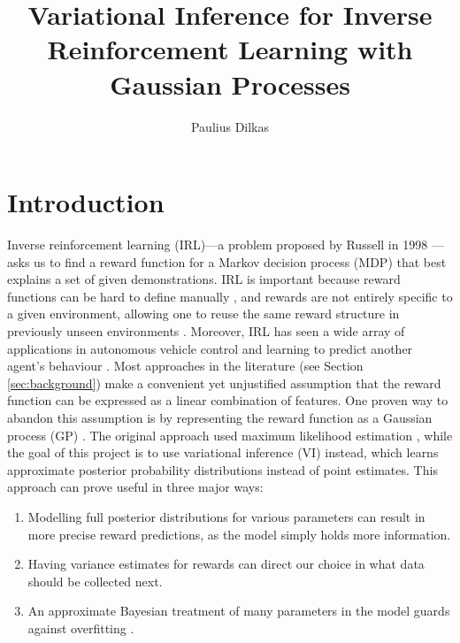 \documentclass{mpaper}
\begin{document}

\title{Variational Inference for Inverse Reinforcement Learning with Gaussian Processes}
\author{Paulius Dilkas}
\maketitle

\begin{abstract}
\end{abstract}

\section{Introduction}

Inverse reinforcement learning (IRL)---a problem proposed by Russell in
1998 \cite{DBLP:conf/colt/Russell98}---asks us to find a reward function for a
Markov decision process (MDP) that best explains a set of given demonstrations.
IRL is important because reward functions can be hard to define manually
\cite{DBLP:conf/icml/PieterN04,DBLP:journals/corr/abs-1806-06877}, and rewards
are not entirely specific to a given environment, allowing one to reuse the same
reward structure in previously unseen environments
\cite{DBLP:journals/corr/abs-1806-06877,DBLP:conf/uai/JinDAS17,DBLP:conf/nips/LevinePK11}.
Moreover, IRL has seen a wide array of applications in autonomous vehicle
control \cite{DBLP:journals/ijsr/KimP16,DBLP:journals/ijrr/KretzschmarSSB16} and
learning to predict another agent's behaviour
\cite{DBLP:journals/ai/BogertD18,DBLP:conf/aaai/VogelRGR12,ziebart2008maximum,DBLP:conf/huc/ZiebartMDB08,DBLP:conf/iros/ZiebartRGMPBHDS09}.
Most approaches in the literature (see Section \ref{sec:background}) make a
convenient yet unjustified assumption that the reward function can be expressed
as a linear combination of features. One proven way to abandon this assumption
is by representing the reward function as a Gaussian process (GP)
\cite{DBLP:conf/uai/JinDAS17,DBLP:conf/nips/LevinePK11,DBLP:journals/corr/abs-1208-2112}.
The original approach used maximum likelihood estimation
\cite{DBLP:conf/nips/LevinePK11}, while the goal of this project is to use
variational inference (VI) instead, which learns approximate posterior
probability distributions instead of point estimates. This approach can prove
useful in three major ways:
\begin{enumerate}
\item Modelling full posterior distributions for various parameters can result
  in more precise reward predictions, as the model simply holds more
  information.
\item Having variance estimates for rewards can direct our choice in what data
  should be collected next.
\item An approximate Bayesian treatment of many parameters in the model guards
  against overfitting \cite{DBLP:conf/uai/JinDAS17}.
\end{enumerate}
\end{document}
